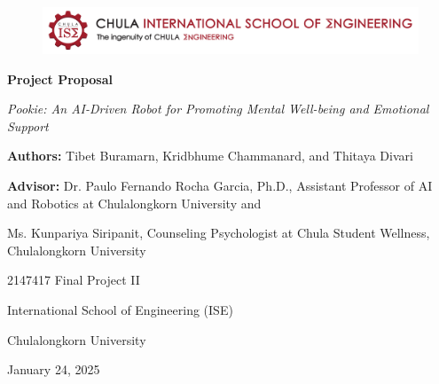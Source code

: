 \documentclass[a4paper,10pt]{article}
\begin{document}
\begin{titlepage}
    \centering  
    \begin{figure}[ht]
        \centering
        \includegraphics[width=\textwidth]{ise-logo.png}
    \end{figure}
    \vspace*{2cm} 
    
    {\Huge \textbf{Project Proposal} \par}
    {\Huge \textit{Pookie: An AI-Driven Robot for Promoting Mental Well-being and Emotional Support} \par}
    \vspace{4cm}
    
    {\large \textbf{Authors:} Tibet Buramarn, Kridbhume Chammanard, and Thitaya Divari \par}
    \vspace{1cm}
    {\large \textbf{Advisor:} Dr. Paulo Fernando Rocha Garcia, Ph.D., Assistant Professor of AI and Robotics at Chulalongkorn University and \par}
    {\large Ms. Kunpariya Siripanit, Counseling Psychologist at Chula Student Wellness, Chulalongkorn University \par}

    \vspace{3cm}
    
    {\large 2147417 Final Project II \par}
    {\large International School of Engineering (ISE) \par}
    {\large Chulalongkorn University \par}
    
    \vspace{2cm}
    
    {\large January 24, 2025 \par}
    
    \vspace*{\fill}
\end{titlepage}

\thispagestyle{empty}
\end{document}
